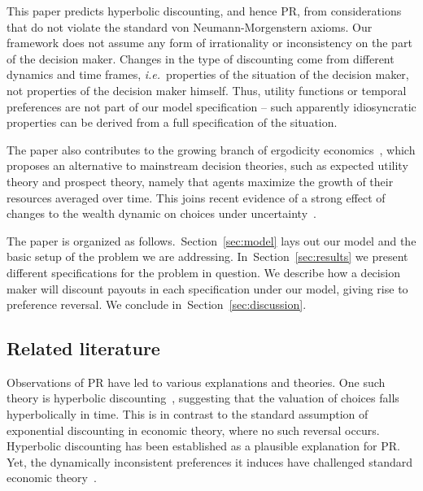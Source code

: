\documentclass[11pt]{article}
\newcommand{\Sref}[1]{Section~\ref{sec:#1}}
\newcommand{\ie}{{\it i.e.}\ }
\numberwithin{equation}{section}
\begin{document}
This paper predicts hyperbolic discounting, and hence PR, from considerations that do not violate the standard von Neumann-Morgenstern axioms. Our framework does not assume any form of irrationality or inconsistency on the part of the decision maker. Changes in the type of discounting come from different dynamics and time frames, \ie properties of the situation of the decision maker, not properties of the decision maker himself. Thus, utility functions or temporal preferences are not part of our model specification -- such apparently idiosyncratic properties can be derived from a full specification of the situation.

The paper also contributes to the growing branch of ergodicity economics~\citep{peters2016evaluating,berman2016far,peters2018time}, which proposes an alternative to mainstream decision theories, such as expected utility theory and prospect theory, namely that agents maximize the growth of their resources averaged over time. This joins recent evidence of a strong effect of changes to the wealth dynamic on choices under uncertainty~\citep{MederETAL2019}.

The paper is organized as follows.~\Sref{model} lays out our model and the basic setup of the problem we are addressing. In~\Sref{results} we present different specifications for the problem in question. We describe how a decision maker will discount payouts in each specification under our model, giving rise to preference reversal. We conclude in~\Sref{discussion}.

\subsection{Related literature}

Observations of PR have led to various explanations and theories. One such theory is hyperbolic discounting~\citep{ainslie1992picoeconomics,sozou1998hyperbolic,laibson1997golden}, suggesting that the valuation of choices falls hyperbolically in time. 
This is in contrast to the standard assumption of exponential discounting in economic theory, where no such reversal occurs.
Hyperbolic discounting has been established as a plausible explanation for PR. 
Yet, the dynamically inconsistent preferences it induces have challenged standard economic theory~\citep{laibson1997golden,starmer2000developments,thaler2016behavioral}. 
\end{document}
